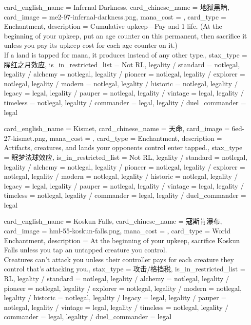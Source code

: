 \documentclass[lang = cn, color = black, 10pt]{AllThatStax}
\begin{document}
\card
{
	card_english_name = {Infernal Darkness},
	card_chinese_name = {地狱黑暗},
	card_image = me2-97-infernal-darkness.png,
	mana_cost = ,
	card_type = Enchantment,
	description = {Cumulative upkeep—Pay  and 1 life. (At the beginning of your upkeep, put an age counter on this permanent, then sacrifice it unless you pay its upkeep cost for each age counter on it.)\\
		If a land is tapped for mana, it produces  instead of any other type.},
	stax_type = 腥红之月效应,
	is_in_restricted_list = Not RL,
	legality / standard = notlegal,
	legality / alchemy = notlegal,
	legality / pioneer = notlegal,
	legality / explorer = notlegal,
	legality / modern = notlegal,
	legality / historic = notlegal,
	legality / legacy = legal,
	legality / pauper = notlegal,
	legality / vintage = legal,
	legality / timeless = notlegal,
	legality / commander = legal,
	legality / duel_commander = legal
}

\card
{
	card_english_name = {Kismet},
	card_chinese_name = {天命},
	card_image = 6ed-27-kismet.png,
	mana_cost = ,
	card_type = Enchantment,
	description = {Artifacts, creatures, and lands your opponents control enter tapped.},
	stax_type = 眠梦法球效应,
	is_in_restricted_list = Not RL,
	legality / standard = notlegal,
	legality / alchemy = notlegal,
	legality / pioneer = notlegal,
	legality / explorer = notlegal,
	legality / modern = notlegal,
	legality / historic = notlegal,
	legality / legacy = legal,
	legality / pauper = notlegal,
	legality / vintage = legal,
	legality / timeless = notlegal,
	legality / commander = legal,
	legality / duel_commander = legal
}

\card
{
	card_english_name = {Koskun Falls},
	card_chinese_name = {寇斯肯瀑布},
	card_image = hml-55-koskun-falls.png,
	mana_cost = ,
	card_type = World Enchantment,
	description = {At the beginning of your upkeep, sacrifice Koskun Falls unless you tap an untapped creature you control.\\
		Creatures can't attack you unless their controller pays  for each creature they control that's attacking you.},
	stax_type = 攻击/格挡税,
	is_in_restricted_list = RL,
	legality / standard = notlegal,
	legality / alchemy = notlegal,
	legality / pioneer = notlegal,
	legality / explorer = notlegal,
	legality / modern = notlegal,
	legality / historic = notlegal,
	legality / legacy = legal,
	legality / pauper = notlegal,
	legality / vintage = legal,
	legality / timeless = notlegal,
	legality / commander = legal,
	legality / duel_commander = legal
}
\end{document}
